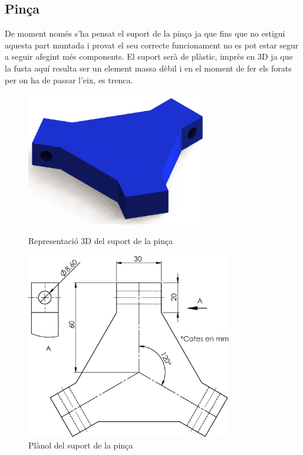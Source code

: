 \subsection{Pinça}
De moment només s'ha pensat el suport de la pinça ja que fins que no estigui aquesta part muntada i provat el seu correcte funcionament no es pot estar segur a seguir afegint més components. 
El suport serà de plàstic, imprès en 3D ja que la fusta aquí resulta ser un element massa dèbil i en el moment de fer els forats per on ha de passar l'eix, es trenca.
\begin{figure}[h!]
\centering
\begin{minipage}[b]{0.45\linewidth}
\centering
\includegraphics[width=8cm]{./imgComp/pinca}
\caption{Representació 3D del suport de la pinça}
\end{minipage}
\hfill
\begin{minipage}[b]{0.45\linewidth}
\centering
\includegraphics[width=9cm]{./sketch/pinca}
\caption{Plànol del suport de la pinça}
\end{minipage}
\end{figure}
